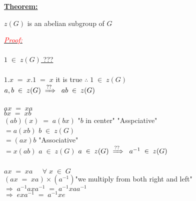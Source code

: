 \documentclass{report}
\newenvironment{Theorem}%
{%
  \par\vspace{\baselineskip}\noindent
  \textbf{\underline{\large{Theorem:}}}\begin{itshape}%
  \par\vspace{\baselineskip}\noindent\ignorespaces
}%
{%
  \end{itshape}\ignorespacesafterend
}
\begin{document}
\begin{tcolorbox}[breakable, enhanced, sharp corners, colback=white!30, colframe=green!80!blue]

\begin{Theorem}
$z(G)$ is an abelian subgroup of $G$
\end{Theorem}
\end{tcolorbox}

\emph{\underline{\textcolor{red}{Proof:}}}\\
\vspace{0.1cm}\\
\hspace*{0.3cm} \underline{$1 \; \in \; z(G)$ \; ???}\\
\vspace{0.06cm}\\
$1 . x \; = \; x . 1 \; = \; x$ \; \; it is true  \; \; $\therefore \; 1 \; \in \; z(G)$\\
\newline
\hspace*{0.3cm} \underline{$ a , b \; \in \; z(G) \; \xRightarrow{\text{??}} \; \; ab \; \in \; z(G)$}\\
\vspace{0.06cm}\\
$ax \; = \; xa$\\
$bx \; = \; xb$\\
$(ab) (x) \; = \; a (bx)$ \; \; \; "$b$ in center" \hfill "Asspciative"\\
\hspace*{0.5cm} $= a (x b)$ \hfill $b \; \in \; z(G)$\\
\hspace*{0.5cm} $= (a x ) b $ \hfill "Associative"\\
\hspace*{0.5cm} $= x (a b)$ \hfill $a \; \in \; z(G)$
\newline
\hspace*{0.3cm} \underline{$a \; \in \; z(G) \; \xRightarrow{\text{??}} \; \; a^{-1} \; \in \; z(G)$}\\
\vspace{0.06cm}\\
$ax \; = \; xa \; \; \; \; \; \forall \; x \; \in \; G$\\
$(ax \; = \; xa) \times (a^{-1})$\hfill "we multiply from both right and left"\\
$\Longrightarrow \; a^{-1} a x a^{-1} \; = \; a^{-1} x a a^{-1}$ \\
$\Longrightarrow \; e x a^{-1} \; = \; a^{-1} x e$\\
\end{document}
